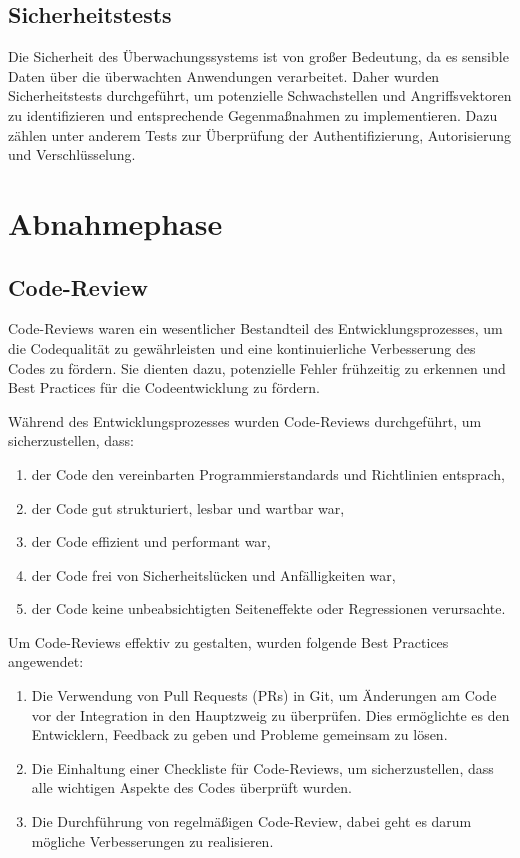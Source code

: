 \begin{flushleft}
	\subsection{Sicherheitstests}
	Die Sicherheit des Überwachungssystems ist von großer Bedeutung, da es sensible Daten über die überwachten Anwendungen verarbeitet. Daher wurden Sicherheitstests durchgeführt, um potenzielle Schwachstellen und Angriffsvektoren zu identifizieren und entsprechende Gegenmaßnahmen zu implementieren. Dazu zählen unter anderem Tests zur Überprüfung der Authentifizierung, Autorisierung und Verschlüsselung.

	\section{Abnahmephase}

	\subsection{Code-Review}
	Code-Reviews waren ein wesentlicher Bestandteil des Entwicklungsprozesses, um die Codequalität zu gewährleisten und eine kontinuierliche Verbesserung des Codes zu fördern. Sie dienten dazu, potenzielle Fehler frühzeitig zu erkennen und Best Practices für die Codeentwicklung zu fördern.

	Während des Entwicklungsprozesses wurden Code-Reviews durchgeführt, um sicherzustellen, dass:

	\begin{enumerate}
	\item der Code den vereinbarten Programmierstandards und Richtlinien entsprach,
	\item der Code gut strukturiert, lesbar und wartbar war,
	\item der Code effizient und performant war,
	\item der Code frei von Sicherheitslücken und Anfälligkeiten war,
	\item der Code keine unbeabsichtigten Seiteneffekte oder Regressionen verursachte.
	\end{enumerate}

	Um Code-Reviews effektiv zu gestalten, wurden folgende Best Practices angewendet:

	\begin{enumerate}
	\item Die Verwendung von Pull Requests (PRs) in Git, um Änderungen am Code vor der Integration in den Hauptzweig zu überprüfen. Dies ermöglichte es den Entwicklern, Feedback zu geben und Probleme gemeinsam zu lösen.
	\item Die Einhaltung einer Checkliste für Code-Reviews, um sicherzustellen, dass alle wichtigen Aspekte des Codes überprüft wurden.
	\item Die Durchführung von regelmäßigen Code-Review, dabei geht es darum mögliche Verbesserungen zu realisieren.
	\end{enumerate}


\end{flushleft}
